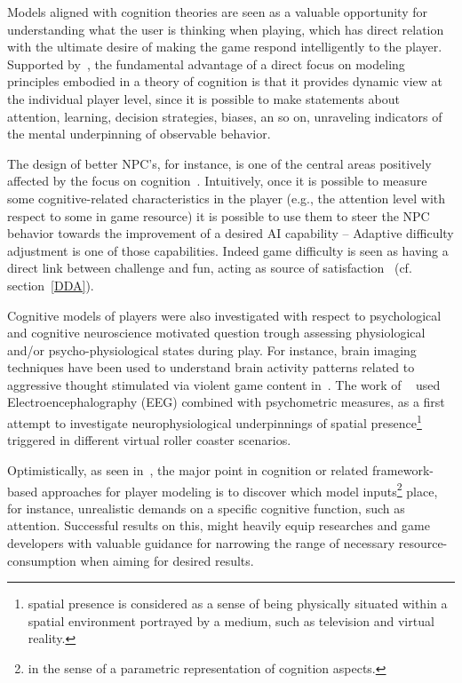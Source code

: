 Models aligned with cognition theories are seen as a valuable opportunity for understanding what the user is thinking when playing, which has direct relation with the ultimate desire of making the game respond intelligently to the player. Supported by~\cite{biocca}, the fundamental advantage of a direct focus on modeling principles embodied in a theory of cognition is that it provides dynamic view at the individual player level, since it is possible to make statements about attention, learning, decision strategies, biases, an so on, unraveling indicators of the mental underpinning of observable behavior. 

The design of better NPC's, for instance, is one of the central areas positively affected by the focus on cognition~\cite{funge1999ai}. Intuitively, once it is possible to measure some cognitive-related characteristics in the player (e.g., the attention level with respect to some in game resource) it is possible to use them to steer the NPC behavior towards the improvement of a desired AI capability -- Adaptive difficulty adjustment is one of those capabilities. Indeed game difficulty is seen as having a direct link between challenge and fun, acting as source of satisfaction~\cite{Koster:2013,yannakakis2006modeling} (cf. section~\ref{DDA}). 

Cognitive models of players were also investigated with respect to psychological and cognitive neuroscience motivated question trough assessing physiological and/or psycho-physiological states during play. For instance, brain imaging techniques have been used to understand brain activity patterns related to aggressive thought stimulated via violent game content in~\cite{weber2006does}. The work of ~\cite{baumgartner2006neural} used Electroencephalography (EEG) combined with psychometric measures, as a first attempt to investigate neurophysiological underpinnings of spatial presence\footnote{spatial presence is considered as a sense of being physically situated within a spatial environment portrayed by a medium, such as television and virtual reality.} triggered in different virtual roller coaster scenarios.

Optimistically, as seen in~\cite{biocca}, the major point in cognition or related framework-based approaches for player modeling is to discover which model inputs\footnote{in the sense of a parametric representation of cognition aspects.} place, for instance, unrealistic demands on a specific cognitive function, such as attention. Successful results on this, might heavily equip researches and game developers with valuable guidance for narrowing the range of necessary resource-consumption when aiming for desired results.   

